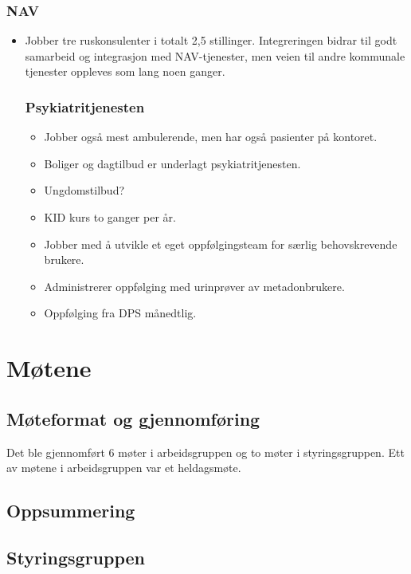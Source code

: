 \documentclass[11pt]{report} %
\begin{document}
      \subsection{NAV}\label{sec:org_nek_nav}
        \begin{itemize}
        \item Jobber tre ruskonsulenter i totalt 2,5 stillinger. Integreringen bidrar til godt samarbeid og integrasjon med NAV-tjenester, men veien til andre kommunale tjenester oppleves som lang noen ganger. 
      \subsection{Psykiatritjenesten}\label{sec:org_nek_psyk}  
            \begin{itemize} 
              \item Jobber også mest ambulerende, men har også pasienter på kontoret. 
              \item Boliger og dagtilbud er underlagt psykiatritjenesten.
              \item Ungdomstilbud?
              \item KID kurs to ganger per år.
              \item Jobber med å utvikle et eget oppfølgingsteam for særlig behovskrevende brukere. 
              \item Administrerer oppfølging med urinprøver av metadonbrukere. 
              \item Oppfølging fra DPS månedtlig.
            \end{itemize}
        \end{itemize}
        



\chapter{Møtene}\label{chap:m_main}
  \section{Møteformat og gjennomføring}\label{sec:m_form}
    Det ble gjennomført 6 møter i arbeidsgruppen og to møter i styringsgruppen. Ett av møtene i arbeidsgruppen var et heldagsmøte.
  \section{Oppsummering}\label{sec:m_sum}  

  \section{Styringsgruppen}\label{sec:m_stygr}
\end{document}
